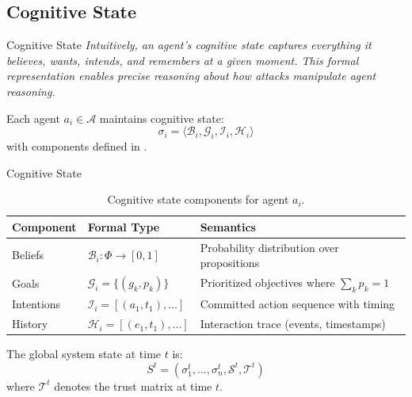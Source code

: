 \documentclass[
  ignorenonframetext,
]{beamer}
\providecommand{\cref}[1]{\texttt{\detokenize{#1}}}
\begin{document}
\subsection{Cognitive State}\label{sec:cognitive-state}

\begin{frame}[allowframebreaks]{Cognitive State}
\emph{Intuitively, an agent's cognitive state captures everything it
believes, wants, intends, and remembers at a given moment. This formal
representation enables precise reasoning about how attacks manipulate
agent reasoning.}

\begin{definition}
\label{def:cognitive-state}
Each agent $a_i \in \mathcal{A}$ maintains cognitive state:
\begin{equation}
\label{eq:cognitive-state}
\sigma_i = \langle \mathcal{B}_i, \mathcal{G}_i, \mathcal{I}_i, \mathcal{H}_i \rangle
\end{equation}
with components defined in \cref{tab:cognitive-components}.
\end{definition}

\end{frame}

\begin{frame}[allowframebreaks]{Cognitive State}
\begin{table}[htbp]
\centering
\caption{Cognitive state components for agent $a_i$.}
\label{tab:cognitive-components}
\begin{tabular}{@{}llp{5.5cm}@{}}
\toprule
Component & Formal Type & Semantics \\
\midrule
Beliefs & $\mathcal{B}_i: \Phi \to [0,1]$ & Probability distribution over propositions \\
Goals & $\mathcal{G}_i = \{(g_k, p_k)\}$ & Prioritized objectives where $\sum_k p_k = 1$ \\
Intentions & $\mathcal{I}_i = [(a_1, t_1), \ldots]$ & Committed action sequence with timing \\
History & $\mathcal{H}_i = [(e_1, t_1), \ldots]$ & Interaction trace (events, timestamps) \\
\bottomrule
\end{tabular}
\end{table}

\begin{definition}
\label{def:system-state}
The global system state at time $t$ is:
\begin{equation}
\label{eq:system-state}
S^t = (\sigma_1^t, \ldots, \sigma_n^t, \mathcal{S}^t, \mathcal{T}^t)
\end{equation}
where $\mathcal{T}^t$ denotes the trust matrix at time $t$.
\end{definition}
\end{frame}
\end{document}
